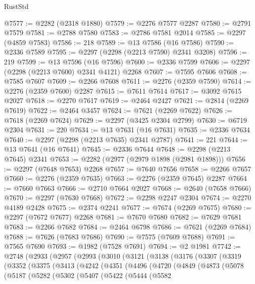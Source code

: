 \begin{lexlean}{RustStd}
\begin{coremodule}
@7577 := @2282 (@2318 @1880)
@7579 := @2276 @7577 @2287
@7580 := @2791 @7579
@7581 := @2788 @7580
@7583 := @2786 @7581 @2014
@7585 := @2297 (@4859 @7583)
@7586 := 218
@7589 := @13 @7586 (@16 @7586)
@7590 := @2336 @7589
@7595 := @2297 (@2298 (@2213 @7590) @2341 @3208)
@7596 := 219
@7599 := @13 @7596 (@16 @7596)
@7600 := @2336 @7599
@7606 := @2297 (@2298 (@2213 @7600) @2341 @4121) @2268
@7607 := @7595 @7606
@7608 := @7585 @7607
@7609 := @2266 @7608
@7611 := @2276 (@2359 @7590)
@7614 := @2276 (@2359 @7600) @2287
@7615 := @7611 @7614
@7617 := @3092 @7615 @2027
@7618 := @2270 @7617
@7619 := @2464 @2427
@7621 := @2814 (@2269 @7619)
@7622 := @2464 @3457
@7624 := @7621 (@2269 @7622)
@7626 := @7618 (@2269 @7624)
@7629 := @2297 (@3425 @2304 @2799)
@7630 := @6719 @2304
@7631 := 220
@7634 := @13 @7631 (@16 @7631)
@7635 := @2336 @7634
@7640 := @2297 (@2298 (@2213 @7635) @2341 @2787)
@7641 := 221
@7644 := @13 @7641 (@16 @7641)
@7645 := @2336 @7644
@7648 := @2298 (@2213 @7645) @2341
@7653 := @2282 (@2977 (@2979 @1898 (@2981 @1898)))
@7656 := @2297 (@7648 @7653) @2268
@7657 := @7640 @7656
@7658 := @2266 @7657
@7660 := @2276 (@2359 @7635)
@7663 := @2276 (@2359 @7645) @2287
@7664 := @7660 @7663
@7666 := @2710 @7664 @2027
@7668 := @2640 (@7658 @7666)
@7670 := @2297 (@7630 @7668)
@7672 := @2298 @2247 @2304
@7674 := @2270 @4189 @2428
@7675 := @2374 @2241
@7677 := @7674 (@2269 @7675)
@7680 := @2297 (@7672 @7677) @2268
@7681 := @7670 @7680
@7682 := @7629 @7681
@7683 := @2266 @7682
@7684 := @2464 @6798
@7686 := @7621 (@2269 @7684)
@7688 := @7626 (@7683 @7686)
@7690 := @7575 (@7609 @7688)
@7691 := @7565 @7690
@7693 := @1982 (@7528 @7691)
@7694 := @2 @1981
@7742 := @2748
    (@2933
      (@2957
        (@2993
          (@3010
            (@3121
              (@3138
                (@3176
                  (@3307
                    (@3319
                      (@3352
                        (@3375
                          (@3413
                            (@4242
                              (@4351
                                (@4496
                                  (@4720
                                    (@4849
                                      (@4873
                                        (@5078
                                          (@5187
                                            (@5282
                                              (@5302
                                                (@5407
                                                  (@5422
                                                    (@5444
                                                      (@5582

\end{coremodule}
\end{lexlean}
